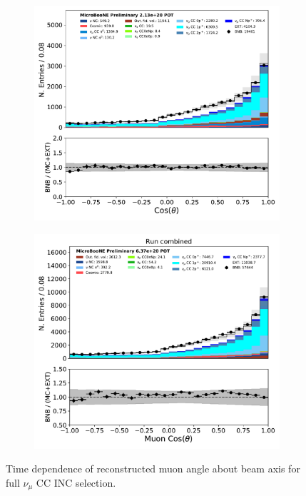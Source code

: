 \begin{figure}[H]
\begin{center}
\begin{subfigure}[b]{0.35\textwidth}
    \end{subfigure}
    \begin{subfigure}[b]{0.35\textwidth}
        \centering
        \includegraphics[width=1.00\textwidth]{NuMuCCsel/Images/Ryan/Run3_nocrt/trk_cos_theta_08052020_fullsel_samples_event_category_noCRT.pdf}
    \end{subfigure} %
    \begin{subfigure}[b]{0.35\textwidth}
        \centering
        \includegraphics[width=1.00\textwidth]{NuMuCCsel/Images/Ryan/combined/trk_cos_theta_v_08052020_full_samples_longest_noCRT_event_category.pdf}
    \end{subfigure}
\caption{Time dependence of reconstructed muon angle about beam axis for full $\nu_{\mu}$ CC INC selection.}
\label{fig:NuMuCCsel:timedep:costheta}
\end{center}
\end{figure}


